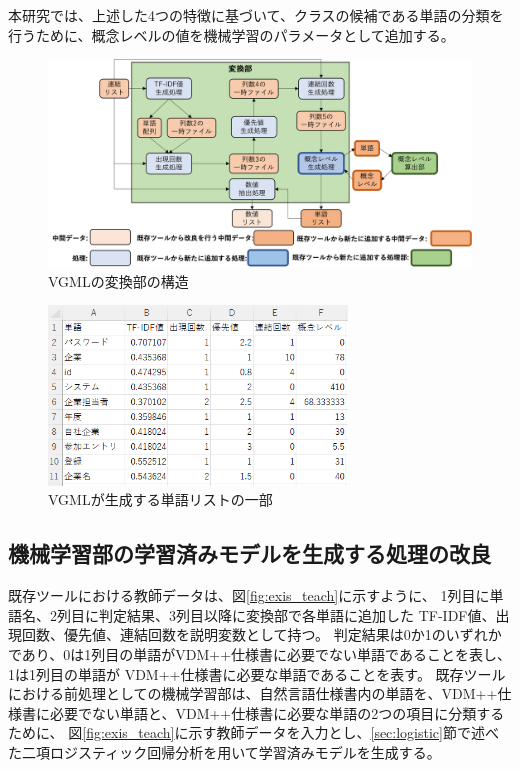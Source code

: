 本研究では、上述した4つの特徴に基づいて、クラスの候補である単語の分類を行うために、概念レベルの値を機械学習のパラメータとして追加する。

\begin{figure}[t]
    \begin{center}
        \includegraphics[width=1.0\columnwidth]{image/vgml_transfer.png}
        \caption{VGMLの変換部の構造}
        \label{fig:vgml_transfer}
    \end{center}
\end{figure}

\begin{figure}[t]
    \begin{center}
        \includegraphics[width=300]{image/vgml_word_list.png}
        \caption{VGMLが生成する単語リストの一部}
        \label{fig:vgml_word_list}
    \end{center}
\end{figure}

\subsection{機械学習部の学習済みモデルを生成する処理の改良}
\label{sec:vgml_train_model}
既存ツールにおける教師データは、図\ref{fig:exis_teach}に示すように、
1列目に単語名、2列目に判定結果、3列目以降に変換部で各単語に追加した TF-IDF値、出現回数、優先値、連結回数を説明変数として持つ。
判定結果は0か1のいずれかであり、0は1列目の単語がVDM++仕様書に必要でない単語であることを表し、
1は1列目の単語が VDM++仕様書に必要な単語であることを表す。
既存ツールにおける前処理としての機械学習部は、自然言語仕様書内の単語を、VDM++仕様書に必要でない単語と、VDM++仕様書に必要な単語の2つの項目に分類するために、
図\ref{fig:exis_teach}に示す教師データを入力とし、\ref{sec:logistic}節で述べた二項ロジスティック回帰分析を用いて学習済みモデルを生成する。

